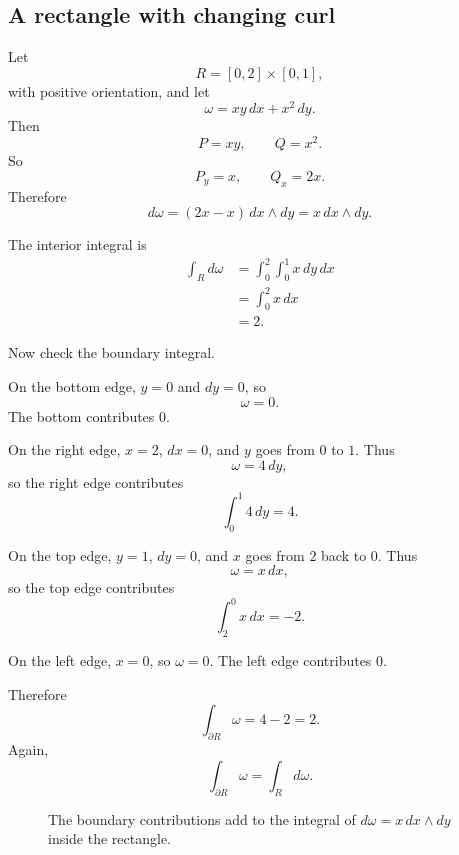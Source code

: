 \subsection{A rectangle with changing curl}

Let
\[
    R=[0,2]\times[0,1],
\]
with positive orientation, and let
\[
    \omega=xy\,dx+x^2\,dy.
\]
Then
\[
    P=xy,
    \qquad
    Q=x^2.
\]
So
\[
    P_y=x,
    \qquad
    Q_x=2x.
\]
Therefore
\[
    d\omega=(2x-x)\,dx\wedge dy=x\,dx\wedge dy.
\]

The interior integral is
\[
\begin{aligned}
    \int_R d\omega
    &=
    \int_0^2\int_0^1 x\,dy\,dx\\
    &=
    \int_0^2 x\,dx\\
    &=
    2.
\end{aligned}
\]

Now check the boundary integral.

On the bottom edge, \(y=0\) and \(dy=0\), so
\[
    \omega=0.
\]
The bottom contributes \(0\).

On the right edge, \(x=2\), \(dx=0\), and \(y\) goes from \(0\) to \(1\).  Thus
\[
    \omega=4\,dy,
\]
so the right edge contributes
\[
    \int_0^1 4\,dy=4.
\]

On the top edge, \(y=1\), \(dy=0\), and \(x\) goes from \(2\) back to \(0\).  Thus
\[
    \omega=x\,dx,
\]
so the top edge contributes
\[
    \int_2^0 x\,dx=-2.
\]

On the left edge, \(x=0\), so \(\omega=0\).  The left edge contributes \(0\).

Therefore
\[
\boxed{
    \int_{\partial R}\omega=4-2=2.
}
\]
Again,
\[
\boxed{
    \int_{\partial R}\omega=\int_R d\omega.
}
\]

\begin{figure}[h]
\centering
{}
\caption{The boundary contributions add to the integral of \(d\omega=x\,dx\wedge dy\)
inside the rectangle.}
\end{figure}

